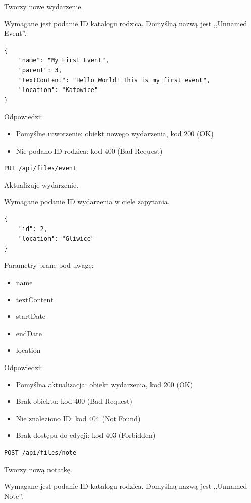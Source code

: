 \documentclass[a4paper,twoside,12pt]{book}
\begin{document}
Tworzy nowe wydarzenie.

Wymagane jest podanie ID katalogu rodzica. Domyślną nazwą jest ,,Unnamed Event''.

\begin{verbatim}
{
    "name": "My First Event",
    "parent": 3,
    "textContent": "Hello World! This is my first event",
    "location": "Katowice"
}
\end{verbatim}

Odpowiedzi: 
\begin{itemize}
	\item Pomyślne utworzenie: obiekt nowego wydarzenia, kod 200 (OK) 
	\item Nie podano ID rodzica: kod 400 (Bad Request)
\end{itemize}

\label{update-event}

\texttt{PUT\ /api/files/event}

Aktualizuje wydarzenie.

Wymagane podanie ID wydarzenia w ciele zapytania.

\begin{verbatim}
{
    "id": 2,
    "location": "Gliwice"
}
\end{verbatim}

Parametry brane pod uwagę: 
\begin{itemize}
	\item  name \item  textContent \item  startDate \item  endDate \item location
\end{itemize}

Odpowiedzi: 
\begin{itemize}
	\item Pomyślna aktualizacja: obiekt wydarzenia, kod 200 (OK) 
	\item Brak obiektu: kod 400 (Bad Request) 
	\item Nie znaleziono ID: kod 404 (Not Found) 
	\item Brak dostępu do edycji: kod 403 (Forbidden)
\end{itemize}

\label{create-note}

\texttt{POST\ /api/files/note}

Tworzy nową notatkę.

Wymagane jest podanie ID katalogu rodzica. Domyślną nazwą jest ,,Unnamed Note''.
\end{document}
